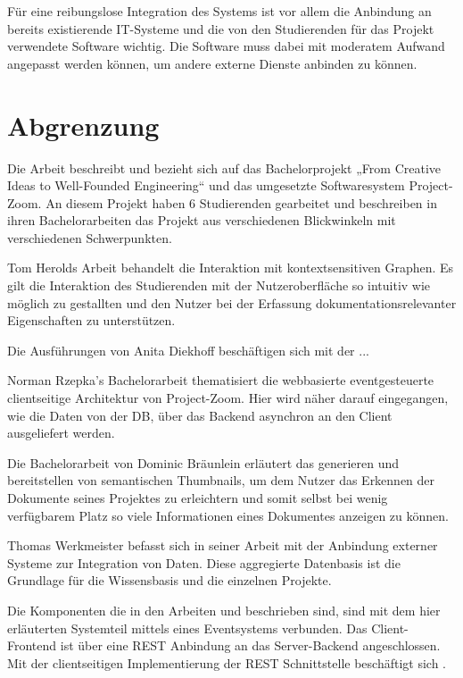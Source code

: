 Für eine reibungslose Integration des Systems ist vor allem die Anbindung an bereits existierende IT-Systeme und die von den Studierenden für das Projekt verwendete Software wichtig. Die Software muss dabei mit moderatem Aufwand angepasst werden können, um andere externe Dienste anbinden zu können.

\section{Abgrenzung}
Die Arbeit beschreibt und bezieht sich auf das Bachelorprojekt „From Creative Ideas to Well-Founded Engineering“ und das umgesetzte Softwaresystem Project-Zoom. An diesem Projekt haben 6 Studierenden gearbeitet und beschreiben in ihren Bachelorarbeiten das Projekt aus verschiedenen Blickwinkeln mit verschiedenen Schwerpunkten.

Tom Herolds Arbeit \cite{bp-tomh} behandelt die Interaktion mit kontextsensitiven Graphen. Es gilt die Interaktion des Studierenden mit der Nutzeroberfläche so intuitiv wie möglich zu gestallten und den Nutzer bei der Erfassung dokumentationsrelevanter Eigenschaften zu unterstützen.

Die Ausführungen von Anita Diekhoff \cite{bp-anita}  beschäftigen sich mit der ...

Norman Rzepka’s Bachelorarbeit \cite{bp-norman} thematisiert die webbasierte eventgesteuerte clientseitige Architektur von Project-Zoom. Hier wird näher darauf eingegangen, wie die Daten von der DB, über das Backend asynchron an den Client ausgeliefert werden.

Die Bachelorarbeit von Dominic Bräunlein \cite{bp-dome} erläutert das generieren und bereitstellen von semantischen Thumbnails, um dem Nutzer das Erkennen der Dokumente seines Projektes zu erleichtern und somit selbst bei wenig verfügbarem Platz so viele Informationen eines Dokumentes anzeigen zu können. 

Thomas Werkmeister befasst sich in seiner Arbeit \cite{bp-tewe} mit der Anbindung externer Systeme zur Integration von Daten. Diese aggregierte Datenbasis ist die Grundlage für die Wissensbasis und die einzelnen Projekte.

Die Komponenten die in den Arbeiten \cite{bp-tewe} und \cite{bp-dome} beschrieben sind, sind mit dem hier erläuterten Systemteil mittels eines Eventsystems verbunden. Das Client-Frontend ist über eine REST Anbindung an das Server-Backend angeschlossen. Mit der clientseitigen Implementierung der REST Schnittstelle beschäftigt sich \cite{bp-norman}.

